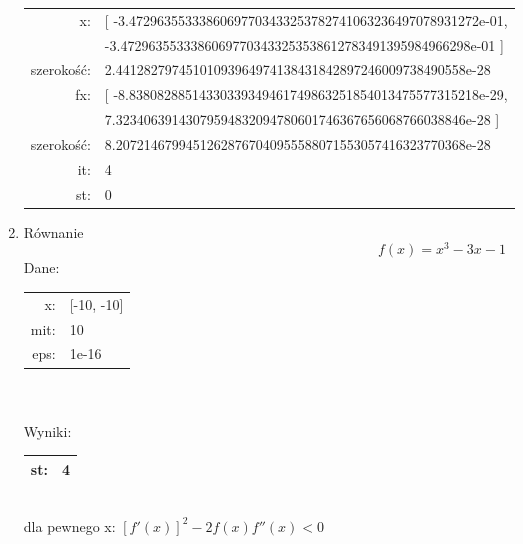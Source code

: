\documentclass[11pt]{article}
\begin{document}
\begin{enumerate}
\begin{tabular}{r|l}
            x:&[ -3.47296355333860697703433253782741063236497078931272e-01, \\
              &-3.47296355333860697703433253538612783491395984966298e-01 ]\\
            szerokość:&2.44128279745101093964974138431842897246009738490558e-28\\
            fx:&[ -8.83808288514330339349461749863251854013475577315218e-29, \\
              &7.32340639143079594832094780601746367656068766038846e-28 ]\\
            szerokość:&8.20721467994512628767040955588071553057416323770368e-28\\
            it:&4\\
            st:&0\\
            \hline
        \end{tabular}
        \item Równanie
        $$f(x) = x^3 - 3x -1$$
        Dane:\\
        \begin{tabular}{r|l}
            
            x:&[-10, -10]\\
            mit:&10\\
            eps:&1e-16\\
            \hline
        \end{tabular}\\\\
        Wyniki:\\
        \begin{tabular}{r|l}
            st:&4\\
            \hline
        \end{tabular}\\
        dla pewnego x: $[f'(x)]^2 -2f(x)f''(x) < 0$
    \end{enumerate}
\pagebreak
\tableofcontents
\end{document}
